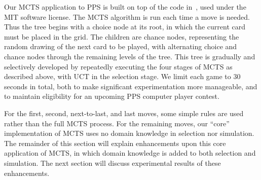 \documentclass[letterpaper]{article}
\begin{document}

Our MCTS application to PPS is built on top of the code in~\cite{hughart2012uct}, used under the MIT software license. The MCTS algorithm is run each time a move is needed. Thus the tree begins with a choice node at its root, in which the current card must be placed in the grid. The children are chance nodes, representing the random drawing of the next card to be played, with alternating choice and chance nodes through the remaining levels of the tree. This tree is gradually and selectively developed by repeatedly executing the four stages of MCTS as described above, with UCT in the selection stage. We limit each game to 30 seconds in total, both to make significant experimentation more manageable, and to maintain eligibility for an upcoming PPS computer player contest. 

For the first, second, next-to-last, and last moves, some simple rules are used rather than the full MCTS process. For the remaining moves, our ``core'' implementation of MCTS uses no domain knowledge in selection nor simulation. The remainder of this section will explain enhancements upon this core application of MCTS, in which domain knowledge is added to both selection and simulation. The next section will discuss experimental results of these enhancements.
\end{document}
